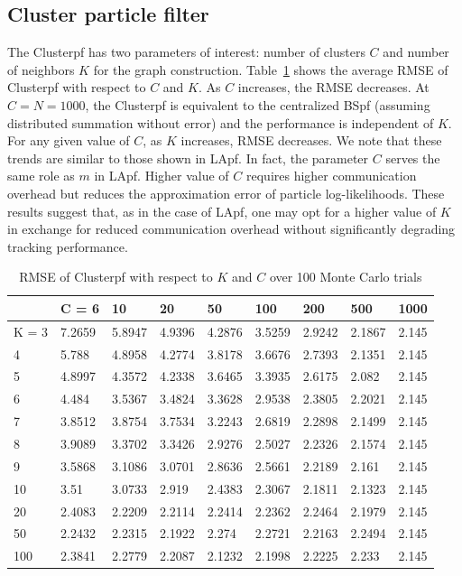 \documentclass[10pt,letterpaper,final]{article}
\begin{document}
\subsection{Cluster particle filter}
The Clusterpf has two parameters of interest: number of clusters $C$ and number of neighbors $K$ for the graph construction. Table~\ref{tab:RMSE_clusterpf} shows the average RMSE of Clusterpf with respect to $C$ and $K$. As $C$ increases, the RMSE decreases. At $C=N=1000$, the Clusterpf is equivalent to the centralized BSpf (assuming distributed summation without error) and the performance is independent of $K$. For any given value of $C$, as $K$ increases, RMSE decreases. We note that these trends are similar to those shown in LApf. In fact, the parameter $C$ serves the same role as $m$ in LApf. Higher value of $C$ requires higher communication overhead but reduces the approximation error of particle log-likelihoods. These results suggest that, as in the case of LApf, one may opt for a higher value of $K$ in exchange for reduced communication overhead without significantly degrading tracking performance.

\begin{table}[h!]
\centering
\begin{tabular}{|l|l|l|l|l|l|l|l|l|}
\hline
      & C = 6  & 10     & 20     & 50     & 100    & 200    & 500    & 1000  \\ \hline
K = 3 & 7.2659 & 5.8947 & 4.9396 & 4.2876 & 3.5259 & 2.9242 & 2.1867 & 2.145 \\ \hline
4     & 5.788  & 4.8958 & 4.2774 & 3.8178 & 3.6676 & 2.7393 & 2.1351 & 2.145 \\ \hline
5     & 4.8997 & 4.3572 & 4.2338 & 3.6465 & 3.3935 & 2.6175 & 2.082  & 2.145 \\ \hline
6     & 4.484  & 3.5367 & 3.4824 & 3.3628 & 2.9538 & 2.3805 & 2.2021 & 2.145 \\ \hline
7     & 3.8512 & 3.8754 & 3.7534 & 3.2243 & 2.6819 & 2.2898 & 2.1499 & 2.145 \\ \hline
8     & 3.9089 & 3.3702 & 3.3426 & 2.9276 & 2.5027 & 2.2326 & 2.1574 & 2.145 \\ \hline
9     & 3.5868 & 3.1086 & 3.0701 & 2.8636 & 2.5661 & 2.2189 & 2.161  & 2.145 \\ \hline
10    & 3.51   & 3.0733 & 2.919  & 2.4383 & 2.3067 & 2.1811 & 2.1323 & 2.145 \\ \hline
20    & 2.4083 & 2.2209 & 2.2114 & 2.2414 & 2.2362 & 2.2464 & 2.1979 & 2.145 \\ \hline
50    & 2.2432 & 2.2315 & 2.1922 & 2.274  & 2.2721 & 2.2163 & 2.2494 & 2.145 \\ \hline
100   & 2.3841 & 2.2779 & 2.2087 & 2.1232 & 2.1998 & 2.2225 & 2.233  & 2.145 \\ \hline
\end{tabular}
\caption{RMSE of Clusterpf with respect to $K$ and $C$ over 100 Monte Carlo trials}
\label{tab:RMSE_clusterpf}
\end{table}
\end{document}
